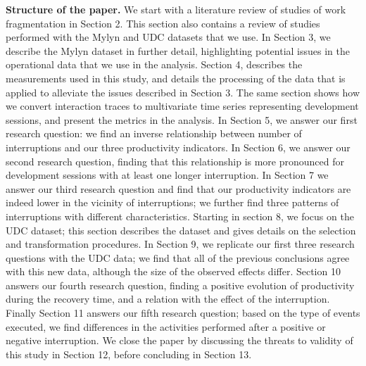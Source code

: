 \documentclass[times]{smrauth}
\begin{document}
\textbf{Structure of the paper.} We start with a literature review of studies of work fragmentation in Section 2. This section also contains a review of studies performed with the Mylyn and UDC datasets that we use. In Section 3, we describe the Mylyn dataset in further detail, highlighting potential issues in the operational data that we use in the analysis. Section 4, describes the measurements used in this study, and details the processing of the data that is applied to alleviate the issues described in Section 3. The same section shows how we convert interaction traces to multivariate time series representing development sessions, and present the metrics in the analysis. In Section 5, we answer our first research question: we find an inverse relationship between number of interruptions and our three productivity indicators. In Section 6, we answer our second research question, finding that this relationship is more pronounced for development sessions with at least one longer interruption. In Section 7 we answer our third research question and find that our productivity indicators are indeed lower in the vicinity of interruptions; we further find three patterns of interruptions with different characteristics. Starting in section 8, we focus on the UDC dataset; this section describes the dataset and gives details on the selection and transformation procedures. In Section 9, we replicate our first three research questions with the UDC data; we find that all of the previous conclusions agree with this new data, although the size of the observed effects differ. Section 10 answers our fourth research question, finding a positive evolution of productivity during the recovery time, and a relation with the effect of the interruption. Finally Section 11 answers our fifth research question; based on the type of events executed, we find differences in the activities performed after a positive or negative interruption. We close the paper by discussing the threats to validity of this study in Section 12, before concluding in Section 13.

\end{document}
